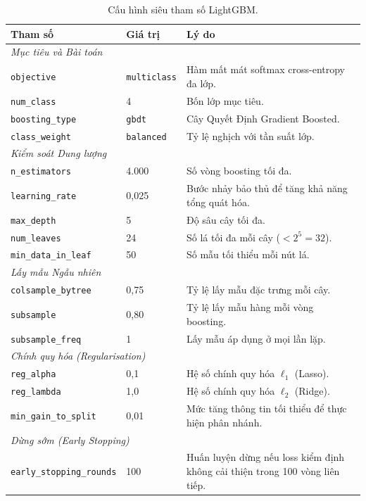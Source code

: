 \documentclass[a4paper,12pt]{article}
\begin{document}
\begin{table}[H]
\centering
\caption{Cấu hình siêu tham số LightGBM.}
\label{tab:hyperparams}
\begin{tabular}{llp{6.2cm}}
\toprule
\textbf{Tham số} & \textbf{Giá trị} & \textbf{Lý do} \\
\midrule
\multicolumn{3}{l}{\textit{Mục tiêu và Bài toán}} \\
\texttt{objective}       & \texttt{multiclass}  & Hàm mất mát softmax cross-entropy đa lớp. \\
\texttt{num\_class}      & 4           & Bốn lớp mục tiêu. \\
\texttt{boosting\_type}  & \texttt{gbdt}        & Cây Quyết Định Gradient Boosted. \\
\texttt{class\_weight}   & \texttt{balanced}    & Tỷ lệ nghịch với tần suất lớp. \\
\midrule
\multicolumn{3}{l}{\textit{Kiểm soát Dung lượng}} \\
\texttt{n\_estimators}       & 4.000 & Số vòng boosting tối đa. \\
\texttt{learning\_rate}      & 0,025  & Bước nhảy bảo thủ để tăng khả năng tổng quát hóa. \\
\texttt{max\_depth}          & 5       & Độ sâu cây tối đa. \\
\texttt{num\_leaves}         & 24      & Số lá tối đa mỗi cây ($< 2^5 = 32$). \\
\texttt{min\_data\_in\_leaf} & 50      & Số mẫu tối thiểu mỗi nút lá. \\
\midrule
\multicolumn{3}{l}{\textit{Lấy mẫu Ngẫu nhiên}} \\
\texttt{colsample\_bytree} & 0,75 & Tỷ lệ lấy mẫu đặc trưng mỗi cây. \\
\texttt{subsample}         & 0,80 & Tỷ lệ lấy mẫu hàng mỗi vòng boosting. \\
\texttt{subsample\_freq}   & 1    & Lấy mẫu áp dụng ở mọi lần lặp. \\
\midrule
\multicolumn{3}{l}{\textit{Chính quy hóa (Regularisation)}} \\
\texttt{reg\_alpha}           & 0,1  & Hệ số chính quy hóa $\ell_1$ (Lasso). \\
\texttt{reg\_lambda}          & 1,0  & Hệ số chính quy hóa $\ell_2$ (Ridge). \\
\texttt{min\_gain\_to\_split} & 0,01 & Mức tăng thông tin tối thiểu để thực hiện phân nhánh. \\
\midrule
\multicolumn{3}{l}{\textit{Dừng sớm (Early Stopping)}} \\
\texttt{early\_stopping\_rounds} & 100 & Huấn luyện dừng nếu loss kiểm định không cải thiện trong 100 vòng liên tiếp. \\
\bottomrule
\end{tabular}
\end{table}
\end{document}
